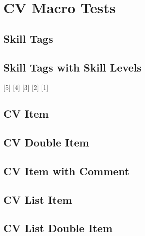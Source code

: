 \documentclass[11pt,letterpaper,sans]{moderncv}
\newcommand*{\Cplusplus}{C{}\texttt{++}}
\begin{document}
\section{CV Macro Tests}
\label{sec:orgbb32964}


\subsection{Skill Tags}
\label{sec:org973741e}
  


\subsection{Skill Tags with Skill Levels}
\label{sec:org9bd1617}
[5] [4] [3] \cvtag{\Cplusplus}[2] [1]


\subsection{CV Item}
\label{sec:orgc2ec1cb}


\subsection{CV Double Item}
\label{sec:org9e524cb}


\subsection{CV Item with Comment}
\label{sec:orgeb5d10b}


\subsection{CV List Item}
\label{sec:org11e95f9}


\subsection{CV List Double Item}
\label{sec:org5dbb5cb}
\end{document}
